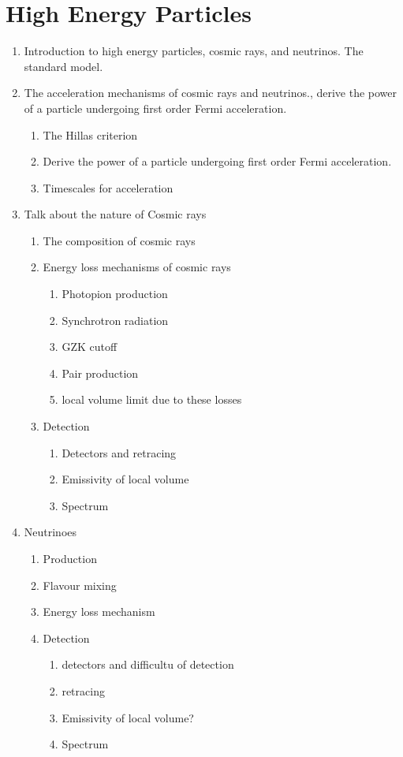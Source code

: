 \section{High Energy Particles}
\label{sec:high_energy_particles}
\begin{enumerate}
    \item Introduction to high energy particles, cosmic rays, and neutrinos. The standard model. 
    \item The acceleration mechanisms of cosmic rays and neutrinos., derive the power of a particle undergoing first order Fermi acceleration.
    \begin{enumerate}
        \item The Hillas criterion
        \item Derive the power of a particle undergoing first order Fermi acceleration.
        \item Timescales for acceleration
    \end{enumerate}
    \item Talk about the nature of Cosmic rays
    \begin{enumerate}
        \item The composition of cosmic rays
        \item Energy loss mechanisms of cosmic rays
        \begin{enumerate}
            \item Photopion production
            \item Synchrotron radiation
            \item GZK cutoff
            \item Pair production
            \item local volume limit due to these losses
        \end{enumerate}
        \item Detection
        \begin{enumerate}
            \item Detectors and retracing
            \item Emissivity of local volume
            \item Spectrum
        \end{enumerate}
    \end{enumerate}
    \item Neutrinoes
    \begin{enumerate}
        \item Production 
        \item Flavour mixing
        \item Energy loss mechanism
        \item Detection
        \begin{enumerate}
            \item detectors and difficultu of detection
            \item retracing
            \item Emissivity of local volume? 
            \item Spectrum 
        \end{enumerate}
    \end{enumerate}

\end{enumerate}

